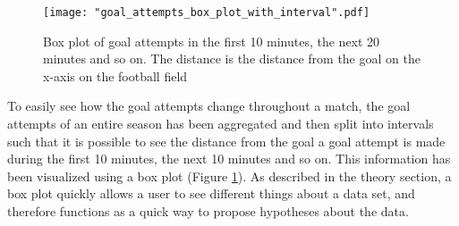 \documentclass[Report.tex]{subfiles}
\begin{document}
\begin{figure}
\center
\texttt{[image: "goal\_attempts\_box\_plot\_with\_interval".pdf]}
\caption{Box plot of goal attempts in the first 10 minutes, the next 20 minutes and so on. The distance is the distance from the goal on the x-axis on the football field}
\label{Fig:goal_attempts_box_plot}
\end{figure}

To easily see how the goal attempts change throughout a match, the goal attempts of an entire season has been aggregated and then
split into intervals such that it is possible to see the distance from the goal a goal attempt is made during the first 10 minutes, the next
10 minutes and so on. This information has been visualized using a box plot (Figure \ref{Fig:goal_attempts_box_plot}). As described in the theory section, a box plot quickly allows a user to see different things about a data set, and therefore functions as a quick way to propose hypotheses about the data.
\end{document}
